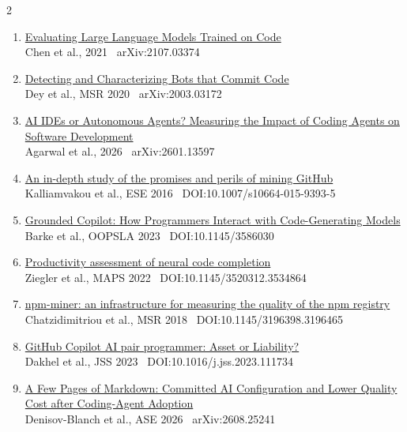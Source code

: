 \documentclass[a4paper,10pt]{article}
\begin{document}
\begin{multicols}{2}
\begin{enumerate}[leftmargin=1.6em, topsep=2pt, itemsep=3.5pt, parsep=0pt]
\item \href{https://arxiv.org/abs/2107.03374}%
  {Evaluating Large Language Models Trained on Code}\\
  {\scriptsize Chen et al., 2021 \textbar\ arXiv:2107.03374}

\item \href{https://arxiv.org/abs/2003.03172}%
  {Detecting and Characterizing Bots that Commit Code}\\
  {\scriptsize Dey et al., MSR 2020 \textbar\ arXiv:2003.03172}

\item \href{https://arxiv.org/abs/2601.13597}%
  {AI IDEs or Autonomous Agents? Measuring the Impact of Coding Agents on Software Development}\\
  {\scriptsize Agarwal et al., 2026 \textbar\ arXiv:2601.13597}

\item \href{https://doi.org/10.1007/s10664-015-9393-5}%
  {An in-depth study of the promises and perils of mining GitHub}\\
  {\scriptsize Kalliamvakou et al., ESE 2016 \textbar\ DOI:10.1007/s10664-015-9393-5}

\item \href{https://doi.org/10.1145/3586030}%
  {Grounded Copilot: How Programmers Interact with Code-Generating Models}\\
  {\scriptsize Barke et al., OOPSLA 2023 \textbar\ DOI:10.1145/3586030}

\item \href{https://doi.org/10.1145/3520312.3534864}%
  {Productivity assessment of neural code completion}\\
  {\scriptsize Ziegler et al., MAPS 2022 \textbar\ DOI:10.1145/3520312.3534864}

\item \href{https://doi.org/10.1145/3196398.3196465}%
  {npm-miner: an infrastructure for measuring the quality of the npm registry}\\
  {\scriptsize Chatzidimitriou et al., MSR 2018 \textbar\ DOI:10.1145/3196398.3196465}

\item \href{https://doi.org/10.1016/j.jss.2023.111734}%
  {GitHub Copilot AI pair programmer: Asset or Liability?}\\
  {\scriptsize Dakhel et al., JSS 2023 \textbar\ DOI:10.1016/j.jss.2023.111734}

\item \href{https://arxiv.org/abs/2608.25241}%
  {A Few Pages of Markdown: Committed AI Configuration and Lower Quality Cost after Coding-Agent Adoption}\\
  {\scriptsize Denisov-Blanch et al., ASE 2026 \textbar\ arXiv:2608.25241}

\end{enumerate}
\end{multicols}
\end{document}

